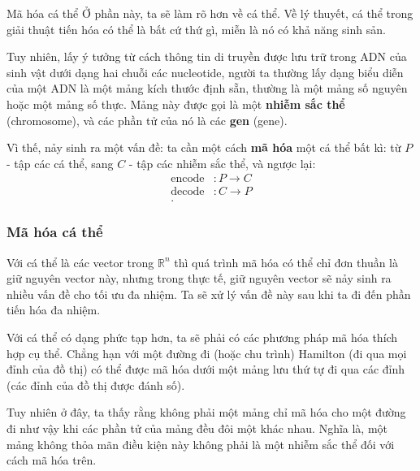 \begin{frame}{Mã hóa cá thể}
Ở phần này, ta sẽ làm rõ hơn về cá thể. Về lý thuyết, cá thể trong giải thuật
tiến hóa có thể là bất cứ thứ gì, miễn là nó có khả năng sinh sản.

Tuy nhiên, lấy ý tưởng từ cách thông tin di truyền được lưu trữ trong ADN của
sinh vật dưới dạng hai chuỗi các nucleotide, người ta thường lấy dạng biểu diễn
của một ADN là một mảng kích thước định sẵn, thường là một mảng số nguyên hoặc
một mảng số thực. Mảng này được gọi là một \textbf{nhiễm sắc thể} (chromosome),
và các phần tử của nó là các \textbf{gen} (gene).

Vì thế, nảy sinh ra một vấn đề: ta cần một cách \textbf{mã hóa} một cá thể bất
kì: từ $P$ - tập các cá thể, sang $C$ - tập các nhiễm sắc thể, và ngược lại:
\begin{align*}
  \operatorname{encode}&: P \to C \\
  \operatorname{decode} &: C \to P \\
.\end{align*}
\end{frame}


\begin{frame}[fragile]
\frametitle{Mã hóa cá thể}
Với cá thể là các vector trong \( \mathbb{R}^{n} \) thì quá trình mã hóa có thể
chỉ đơn thuần là giữ nguyên vector này, nhưng trong thực tế, giữ nguyên vector
sẽ nảy sinh ra nhiều vấn đề cho tối ưu đa nhiệm. Ta sẽ xử lý vấn đề này sau khi
ta đi đến phần tiến hóa đa nhiệm.

Với cá thể có dạng phức tạp hơn, ta sẽ phải có các phương pháp mã hóa thích hợp
cụ thể. Chẳng hạn với một đường đi (hoặc chu trình) Hamilton (đi qua mọi đỉnh của đồ
thị) có thể được mã hóa dưới một mảng lưu thứ tự đi qua các đỉnh (các đỉnh của
đồ thị được đánh số).

Tuy nhiên ở đây, ta thấy rằng không phải một mảng chỉ mã hóa cho một đường đi
như vậy khi các phần tử của mảng đều đôi một khác nhau. Nghĩa là, một mảng không
thỏa mãn điều kiện này không phải là một nhiễm sắc thể đối với cách mã hóa trên.
\end{frame}

